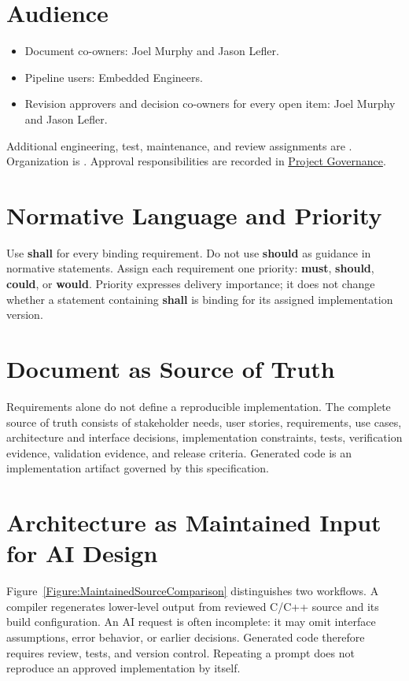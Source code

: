 \section{Audience}
\label{Section:ProjectStakeholders}
\begin{itemize}
\item Document co-owners: Joel Murphy and Jason Lefler.
\item Pipeline users: Embedded Engineers.
\item Revision approvers and decision co-owners for every open \OwnedTBD{} item: Joel Murphy and Jason Lefler.
\end{itemize}
Additional engineering, test, maintenance, and review assignments are \OwnedTBD{}.
Organization is \OwnedTBD{}. Approval responsibilities are recorded in
\hyperref[Section:ProjectGovernance]{Project Governance}.

\section{Normative Language and Priority}
Use \textbf{shall} for every binding requirement. Do not use \textbf{should} as
guidance in normative statements. Assign each requirement one priority:
\textbf{\gls{must}}, \textbf{\gls{should}}, \textbf{\gls{could}}, or
\textbf{\gls{would}}. Priority expresses delivery importance; it does not change
whether a statement containing \textbf{shall} is binding for its assigned
implementation version.

\section{Document as Source of Truth}
Requirements alone do not define a reproducible implementation. The complete
source of truth consists of stakeholder needs, user stories, requirements, use
cases, architecture and interface decisions, implementation constraints,
tests, verification evidence, validation evidence, and release criteria.
Generated code is an implementation artifact governed by this specification.

\section{Architecture as Maintained Input for AI Design}
\label{Section:ArchitectureAIDesign}
Figure~\ref{Figure:MaintainedSourceComparison} distinguishes two workflows.
A compiler regenerates lower-level output from reviewed C/C++ source and its
build configuration. An AI request is often incomplete: it may omit interface
assumptions, error behavior, or earlier decisions. Generated code therefore
requires review, tests, and version control. Repeating a prompt does not
reproduce an approved implementation by itself.

